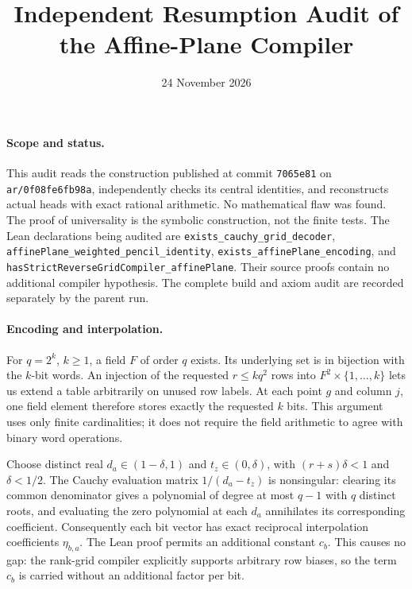 \documentclass[11pt]{article}
\title{Independent Resumption Audit of the Affine-Plane Compiler}
\author{}\date{24 November 2026}
\begin{document}
\maketitle

\paragraph{Scope and status.}
This audit reads the construction published at commit \texttt{7065e81} on
\texttt{ar/0f08fe6fb98a}, independently checks its central identities, and
reconstructs actual heads with exact rational arithmetic. No mathematical
flaw was found. The proof of universality is the symbolic construction,
not the finite tests. The Lean declarations being audited are
\texttt{exists\_cauchy\_grid\_decoder},
\texttt{affinePlane\_weighted\_pencil\_identity},
\texttt{exists\_affinePlane\_encoding}, and
\texttt{hasStrictReverseGridCompiler\_affinePlane}.
Their source proofs contain no additional compiler hypothesis.
The complete build and axiom audit are recorded separately by the parent run.

\paragraph{Encoding and interpolation.}
For $q=2^k$, $k\geq1$, a field $F$ of order $q$ exists. Its underlying set
is in bijection with the $k$-bit words. An injection of the requested
$r\leq kq^2$ rows into $F^2\times\{1,\ldots,k\}$ lets us extend a table
arbitrarily on unused row labels. At each point $g$ and column $j$, one
field element therefore stores exactly the requested $k$ bits.
This argument uses only finite cardinalities; it does not require the
field arithmetic to agree with binary word operations.

Choose distinct real $d_a\in(1-\delta,1)$ and
$t_z\in(0,\delta)$, with $(r+s)\delta<1$ and $\delta<1/2$.
The Cauchy evaluation matrix $1/(d_a-t_z)$ is nonsingular: clearing its
common denominator gives a polynomial of degree at most $q-1$ with $q$
distinct roots, and evaluating the zero polynomial at each $d_a$
annihilates its corresponding coefficient. Consequently each bit vector
has exact reciprocal interpolation coefficients $\eta_{b,a}$.
The Lean proof permits an additional constant $c_b$. This causes no gap:
the rank-grid compiler explicitly supports arbitrary row biases, so the
term $c_b$ is carried without an additional factor per bit.
\end{document}
